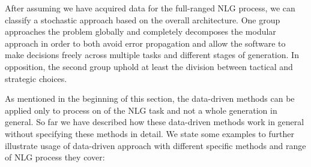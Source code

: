 After assuming we have acquired data for the full-ranged NLG process, we can classify a stochastic approach based on the overall architecture. One group approaches the problem globally and completely decomposes the modular approach in order to both avoid error propagation and allow the software to make decisions freely across multiple tasks and different stages of generation. In opposition, the second group uphold at least the division between tactical and strategic choices.  

As mentioned in the beginning of this section, the data-driven methods can be applied only to process on of the NLG task and not a whole generation in general. So far we have described how these data-driven methods work in general without specifying these methods in detail. We state some examples to further illustrate usage of data-driven approach with different specific methods and range of NLG process they cover:
